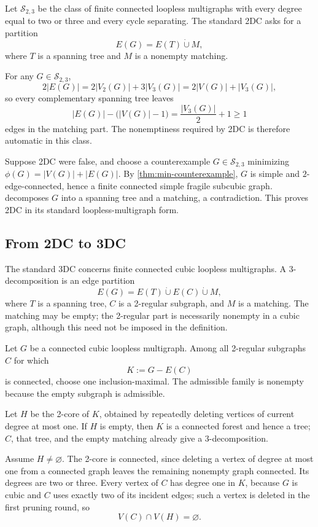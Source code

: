 \documentclass[a4paper,11pt]{article}
\newcommand{\abs}[1]{\left\lvert#1\right\rvert}
\newcommand{\Vtwo}{V_2}                      %
\newcommand{\Vthree}{V_3}                     %
\newcommand{\dcup}{\mathbin{\dot\cup}}         %
\newcommand{\empt}{\varnothing}                %
\numberwithin{equation}{section}
\begin{document}
Let $\mathcal S_{2,3}$ be the class of finite connected loopless
multigraphs with every degree equal to two or three and every cycle separating.
The standard 2DC asks for a partition
\[
  E(G)=E(T)\dcup M,
\]
where $T$ is a spanning tree and $M$ is a nonempty matching.

For any $G\in\mathcal S_{2,3}$,
\[
  2\abs{E(G)}=2\abs{\Vtwo(G)}+3\abs{\Vthree(G)}=2\abs{V(G)}+\abs{\Vthree(G)},
\]
so every complementary spanning tree leaves
\begin{equation}\label{eq:matching-nonempty}
  \abs{E(G)}-\bigl(\abs{V(G)}-1\bigr)=\frac{\abs{\Vthree(G)}}{2}+1\ge 1
\end{equation}
edges in the matching part. The nonemptiness required by 2DC is therefore
automatic in this class.

Suppose 2DC were false, and choose a counterexample $G\in\mathcal S_{2,3}$
minimizing $\phi(G)=\abs{V(G)}+\abs{E(G)}$. By
\cref{thm:min-counterexample}, $G$ is simple and $2$-edge-connected,
hence a finite connected simple fragile subcubic graph.
 decomposes $G$ into a spanning tree and a
matching, a contradiction. This proves 2DC in its standard loopless-multigraph
form.

\subsection{From 2DC to 3DC}\label{sec:2dc-to-3dc}

The standard 3DC concerns finite connected cubic loopless multigraphs. A
$3$-decomposition is an edge partition
\[
  E(G)=E(T)\dcup E(C)\dcup M,
\]
where $T$ is a spanning tree, $C$ is a 2-regular subgraph, and $M$ is a
matching. The matching may be empty; the 2-regular part is necessarily nonempty
in a cubic graph, although this need not be imposed in the definition.

Let $G$ be a connected cubic loopless multigraph. Among all 2-regular subgraphs
$C$ for which
\[
  K:=G-E(C)
\]
is connected, choose one inclusion-maximal. The admissible family is nonempty
because the empty subgraph is admissible.

Let $H$ be the 2-core of $K$, obtained by repeatedly deleting vertices of
current degree at most one. If $H$ is empty, then $K$ is a connected forest and
hence a tree; $C$, that tree, and the empty matching already give a
$3$-decomposition.

Assume $H\ne\empt$. The 2-core is connected, since deleting a vertex of degree
at most one from a connected graph leaves the remaining nonempty graph
connected. Its degrees are two or three. Every vertex of $C$ has degree one in
$K$, because $G$ is cubic and $C$ uses exactly two of its incident edges; such a
vertex is deleted in the first pruning round, so
\begin{equation}\label{eq:VC-disjoint}
  V(C)\cap V(H)=\empt .
\end{equation}
\end{document}
